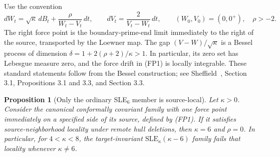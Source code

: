 \documentclass[11pt]{article}
\newtheorem{proposition}[theorem]{Proposition}
\theoremstyle{definition}\newtheorem{definition}[theorem]{Definition}
\theoremstyle{remark}\newtheorem{remark}[theorem]{Remark}
\begin{document}
Use the convention
\[
 dW_t=\sqrt\kappa\,dB_t+\frac\rho{W_t-V_t}\,dt,
 \qquad dV_t=\frac2{V_t-W_t}\,dt,
 \qquad (W_0,V_0)=(0,0^+),\quad \rho>-2.
 \tag{FP1}
\]
The right force point is the boundary-prime-end limit immediately to
the right of the source, transported by the Loewner map. The gap
$(V-W)/\sqrt\kappa$ is a Bessel process of dimension
$\delta=1+2(\rho+2)/\kappa>1$. In particular, its zero set has Lebesgue
measure zero, and the force drift in (FP1) is locally integrable.
These standard statements follow from the Bessel construction; see
Sheffield~\cite{sheffield-cle}, Section 3.1, Propositions 3.1 and 3.3,
and Section 3.3.

\begin{proposition}[Only the ordinary SLE$_6$ member is source-local]
\label{prop:forcepoint-locality-exclusion}
Let $\kappa>0$. Consider the canonical conformally covariant family with one force point
immediately on a specified side of its source, defined by (FP1).
If it satisfies source-neighborhood locality under remote hull deletions,
then $\kappa=6$ and $\rho=0$.
In particular, for $4<\kappa<8$, the target-invariant
$\mathrm{SLE}_\kappa(\kappa-6)$ family fails that locality whenever
$\kappa\ne6$.
\end{proposition}
\end{document}
